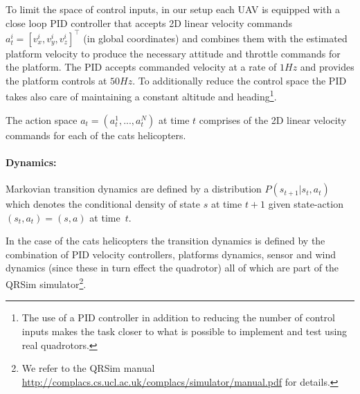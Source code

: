 \documentclass[a4paper,11pt]{report}
\newcommand{\sname}{QRSim\xspace}
\newcommand{\webman}{\url{http://complacs.cs.ucl.ac.uk/complacs/simulator/manual.pdf}\xspace}
\begin{document}
To limit the space of control inputs, in our setup each UAV is equipped with a close loop PID controller that accepts 2D linear velocity commands $a^i_t=[v^i_x,v^i_y,v^i_z]^\intercal$ (in global coordinates) and combines them with the estimated platform velocity to produce the necessary attitude and throttle commands for the platform. The PID accepts commanded velocity at a rate of $1Hz$ and provides the platform controls at $50Hz$.
To additionally reduce the control space the PID takes also care of maintaining a constant altitude and heading\footnote{The use of a PID controller in addition to reducing the number of control inputs makes the task closer to what is possible to implement and test using real quadrotors.}. 

The action space $a_t = (a^1_t,...,a^{N}_t)$ at time $t$ comprises of the 2D linear velocity commands for each of the cats helicopters. 

\paragraph{Dynamics:} 
Markovian transition dynamics are defined by a distribution $P(s_{t+1}|s_t,a_t)$ which denotes the conditional density of state $s$ at time $t+1$ given state-action $(s_t,a_t)=(s,a)$ at time~$t$.

In the case of the cats helicopters the transition dynamics is defined by the combination of PID velocity controllers, platforms dynamics, sensor and wind dynamics (since these in turn effect the quadrotor) all of which are part of the \sname simulator\footnote{We refer to the \sname manual \webman for details.}. 
\end{document}
